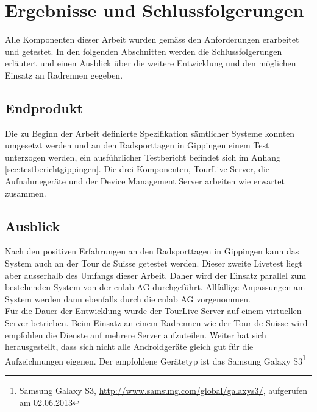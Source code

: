 \chapter{Ergebnisse und Schlussfolgerungen}

Alle Komponenten dieser Arbeit wurden gemäss den Anforderungen erarbeitet und getestet. In den folgenden Abschnitten werden die Schlussfolgerungen erläutert und einen Ausblick über die weitere Entwicklung und den möglichen Einsatz an Radrennen gegeben.

\section{Endprodukt}
Die zu Beginn der Arbeit definierte Spezifikation sämtlicher Systeme konnten umgesetzt werden und an den Radsporttagen in Gippingen einem Test unterzogen werden, ein ausführlicher Testbericht befindet sich im Anhang \ref{sec:testberichtgippingen}. Die drei Komponenten, TourLive Server, die Aufnahmegeräte und der Device Management Server arbeiten wie erwartet zusammen.
\\

\section{Ausblick}
Nach den positiven Erfahrungen an den Radsporttagen in Gippingen kann das System auch an der Tour de Suisse getestet werden. Dieser zweite Livetest liegt aber ausserhalb des Umfangs dieser Arbeit. Daher wird der Einsatz parallel zum bestehenden System von der cnlab AG durchgeführt. Allfällige Anpassungen am System werden dann ebenfalls durch die cnlab AG vorgenommen.
\\

Für die Dauer der Entwicklung wurde der TourLive Server auf einem virtuellen Server betrieben. Beim Einsatz an einem Radrennen wie der Tour de Suisse wird empfohlen die Dienste auf mehrere Server aufzuteilen. Weiter hat sich herausgestellt, dass sich nicht alle Androidgeräte gleich gut für die Aufzeichnungen eigenen. Der empfohlene Gerätetyp ist das Samsung Galaxy S3\footnote{Samsung Galaxy S3, \url{http://www.samsung.com/global/galaxys3/}, aufgerufen am 02.06.2013}

